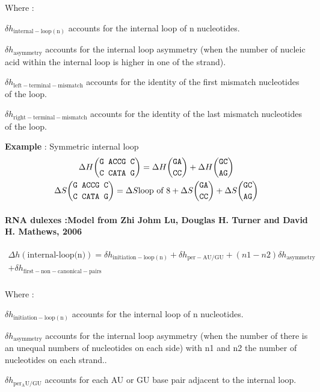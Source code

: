 \documentclass{article}
\begin{document}
Where :

$\delta{}h_\mathrm{internal-loop(n)}$ accounts for the internal loop of n nucleotides.

$\delta{}h_\mathrm{asymmetry}$ accounts for the internal loop asymmetry (when the number of
nucleic acid within the internal loop is higher in one of the strand).

$\delta{}h_\mathrm{left-terminal-mismatch}$ accounts for the identity of the first mismatch 
nucleotides of the loop.

$\delta{}h_\mathrm{right-terminal-mismatch}$ accounts for the identity of the last mismatch 
nucleotides of the loop.

\textbf{Example} : Symmetric internal loop
\begin{multline*}
\Delta H {\mbox{\texttt{G ACCG C}} \choose \mbox{\texttt{C CATA G}}} = 
\Delta H {\mbox{\texttt{GA}} \choose \mbox{\texttt{CC}}} +
\Delta H {\mbox{\texttt{GC}} \choose \mbox{\texttt{AG}}}\\
\Delta S {\mbox{\texttt{G ACCG C}} \choose \mbox{\texttt{C CATA G}}} = 
\Delta S {\mbox{loop of 8}} +
\Delta S {\mbox{\texttt{GA}} \choose \mbox{\texttt{CC}}} +
\Delta S {\mbox{\texttt{GC}} \choose \mbox{\texttt{AG}}}\\
\end{multline*}

\paragraph{RNA dulexes :\textbf{Model from Zhi Johm Lu, Douglas H. Turner and David H. Mathews, 2006}}

\begin{multline*}
\Delta h {(\mbox{internal-loop(n)})} =
\delta{}h_\mathrm{initiation-loop(n)} +
\delta{}h_\mathrm{per-AU/GU} +
(n1 - n2) \delta{}h_\mathrm{asymmetry} \\ +
\delta{}h_\mathrm{first-non-canonical-pairs}\\
\end{multline*}


Where :

$\delta{}h_\mathrm{initiation-loop(n)}$ accounts for the internal loop of n nucleotides.

$\delta{}h_\mathrm{asymmetry}$ accounts for the internal loop asymmetry (when the number of
there is an unequal numbers of nucleotides on each side) with n1 and n2 the
number of nucleotides on each strand..

$\delta{}h_\mathrm{per_AU/GU}$ accounts for each AU or GU base pair adjacent
to the internal loop.
\end{document}
